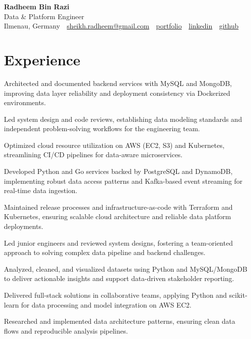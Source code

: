\documentclass[11pt,a4paper]{resume}
\makeatletter
\newcommand{\Portfolio}{https://radheem.github.io/my-cv}
\newcommand{\PortfolioText}{portfolio}
\newcommand{\GitHub}{https://github.com/radheem}
\newcommand{\LinkedIn}{https://www.linkedin.com/in/radheem-razi}
\newcommand{\Email}{sheikh.radheem@gmail.com}
\makeatother
\begin{document}
\begin{center}
  {\huge\bfseries Radheem Bin Razi}\\[3pt]
  {\large Data \& Platform Engineer}\\[6pt]
  \small
  Ilmenau, Germany \,\textbar\,
  \href{mailto:\Email}{\Email} \,\textbar\,
  \href{\Portfolio}{\PortfolioText} \,\textbar\,
  \href{\LinkedIn}{linkedin} \,\textbar\,
  \href{\GitHub}{github}
\end{center}
\vspace{2pt}

\section{Experience}

\bullets
  \item Architected and documented backend services with MySQL and MongoDB, improving data layer reliability and deployment consistency via Dockerized environments.
  \item Led system design and code reviews, establishing data modeling standards and independent problem-solving workflows for the engineering team.
  \item Optimized cloud resource utilization on AWS (EC2, S3) and Kubernetes, streamlining CI/CD pipelines for data-aware microservices.
\bulletsend
\vspace{3pt}
\bullets
  \item Developed Python and Go services backed by PostgreSQL and DynamoDB, implementing robust data access patterns and Kafka-based event streaming for real-time data ingestion.
  \item Maintained release processes and infrastructure-as-code with Terraform and Kubernetes, ensuring scalable cloud architecture and reliable data platform deployments.
  \item Led junior engineers and reviewed system designs, fostering a team-oriented approach to solving complex data pipeline and backend challenges.
\bulletsend
\vspace{3pt}
\bullets
  \item Analyzed, cleaned, and visualized datasets using Python and MySQL/MongoDB to deliver actionable insights and support data-driven stakeholder reporting.
  \item Delivered full-stack solutions in collaborative teams, applying Python and scikit-learn for data processing and model integration on AWS EC2.
  \item Researched and implemented data architecture patterns, ensuring clean data flows and reproducible analysis pipelines.
\bulletsend
\vspace{3pt}
\end{document}
